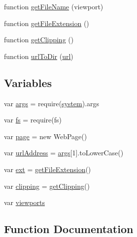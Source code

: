\begin{DoxyCompactItemize}
\item 
function \hyperlink{responsive-screenshot_8js_aef8d74268b9976dc3ed881e3593a29b1}{get\+File\+Name} (viewport)
\item 
function \hyperlink{responsive-screenshot_8js_a9f5def91abd2944c728e243fa418bc6f}{get\+File\+Extension} ()
\item 
function \hyperlink{responsive-screenshot_8js_a758a4d0cb35c31dee79146da2bddfc0d}{get\+Clipping} ()
\item 
function \hyperlink{responsive-screenshot_8js_ac6324f309d86358a00f0fbca484a3257}{url\+To\+Dir} (\hyperlink{server_8js_a273346471dff7030093765f4e043d101}{url})
\end{DoxyCompactItemize}
\subsection*{Variables}
\begin{DoxyCompactItemize}
\item 
var \hyperlink{responsive-screenshot_8js_a64e5c861448a80a00f5c93e96de17d7a}{args} = require(\textquotesingle{}\hyperlink{stdin-stdout-stderr_8js_acdb77dc97eb44e91baaadd41d9d078fc}{system}\textquotesingle{}).args
\item 
var \hyperlink{responsive-screenshot_8js_aebcdd70130f7e0b00b39cc981ab0bab0}{fs} = require(\textquotesingle{}fs\textquotesingle{})
\item 
var \hyperlink{responsive-screenshot_8js_a85d8b1b97106b359e1c9ee119ebe5832}{page} = new Web\+Page()
\item 
var \hyperlink{responsive-screenshot_8js_a5acdc5bac87276538445379382dba523}{url\+Address} = \hyperlink{responsive-screenshot_8js_a64e5c861448a80a00f5c93e96de17d7a}{args}\mbox{[}1\mbox{]}.to\+Lower\+Case()
\item 
var \hyperlink{responsive-screenshot_8js_af37ccdf7a718667b94d302bb07937162}{ext} = \hyperlink{responsive-screenshot_8js_a9f5def91abd2944c728e243fa418bc6f}{get\+File\+Extension}()
\item 
var \hyperlink{responsive-screenshot_8js_a2b6584f3e4fa2fd3eb22798214519b67}{clipping} = \hyperlink{responsive-screenshot_8js_a758a4d0cb35c31dee79146da2bddfc0d}{get\+Clipping}()
\item 
var \hyperlink{responsive-screenshot_8js_a00da385fc9be9cb4e2d703a1fc928ef1}{viewports}
\end{DoxyCompactItemize}


\subsection{Function Documentation}
